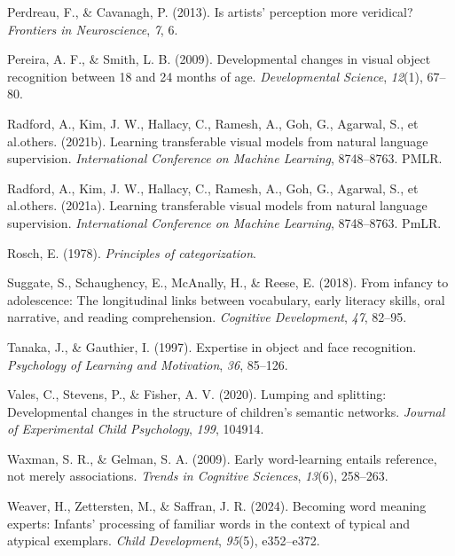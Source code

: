\documentclass[
  man,mask]{apa6}
\newlength{\cslhangindent}
\newenvironment{CSLReferences}[2] %
 {\begin{list}{}{%
  \setlength{\itemindent}{0pt}
  \setlength{\leftmargin}{0pt}
  \setlength{\parsep}{0pt}
  \ifodd #1
   \setlength{\leftmargin}{\cslhangindent}
   \setlength{\itemindent}{-1\cslhangindent}
  \fi
  \setlength{\itemsep}{#2\baselineskip}}}
 {\end{list}}
\begin{document}
\begin{CSLReferences}{1}{0}
Perdreau, F., \& Cavanagh, P. (2013). Is artists' perception more veridical? \emph{Frontiers in Neuroscience}, \emph{7}, 6.

Pereira, A. F., \& Smith, L. B. (2009). Developmental changes in visual object recognition between 18 and 24 months of age. \emph{Developmental Science}, \emph{12}(1), 67--80.

Radford, A., Kim, J. W., Hallacy, C., Ramesh, A., Goh, G., Agarwal, S., et al.others. (2021b). Learning transferable visual models from natural language supervision. \emph{International Conference on Machine Learning}, 8748--8763. PMLR.

Radford, A., Kim, J. W., Hallacy, C., Ramesh, A., Goh, G., Agarwal, S., et al.others. (2021a). Learning transferable visual models from natural language supervision. \emph{International Conference on Machine Learning}, 8748--8763. PmLR.

Rosch, E. (1978). \emph{Principles of categorization}.

Suggate, S., Schaughency, E., McAnally, H., \& Reese, E. (2018). From infancy to adolescence: The longitudinal links between vocabulary, early literacy skills, oral narrative, and reading comprehension. \emph{Cognitive Development}, \emph{47}, 82--95.

Tanaka, J., \& Gauthier, I. (1997). Expertise in object and face recognition. \emph{Psychology of Learning and Motivation}, \emph{36}, 85--126.

Vales, C., Stevens, P., \& Fisher, A. V. (2020). Lumping and splitting: {Developmental} changes in the structure of children's semantic networks. \emph{Journal of Experimental Child Psychology}, \emph{199}, 104914.

Waxman, S. R., \& Gelman, S. A. (2009). Early word-learning entails reference, not merely associations. \emph{Trends in Cognitive Sciences}, \emph{13}(6), 258--263.

Weaver, H., Zettersten, M., \& Saffran, J. R. (2024). Becoming word meaning experts: Infants' processing of familiar words in the context of typical and atypical exemplars. \emph{Child Development}, \emph{95}(5), e352--e372.

\end{CSLReferences}


\clearpage
\renewcommand{\listfigurename}{Figure captions}
\end{document}
